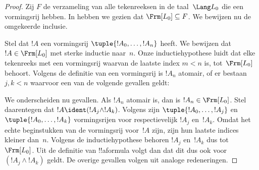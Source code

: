 \documentclass[../../../include/open-logic-section]{subfiles}
\begin{document}
\begin{proof}
Zij $F$ de verzameling van alle tekenreeksen in de taal~$\Lang L_0$
die een vormingsrij hebben. In 
hebben we gezien dat $\Frm[L_0] \subseteq F$. We bewijzen nu de
omgekeerde inclusie.

Stel dat $!A$ een vormingsrij $\tuple{!A_0,\dotsc,!A_n}$ heeft. We
bewijzen dat $!A \in \Frm[L_0]$ met sterke inductie naar~$n$. Onze
inductiehypothese luidt dat elke tekenreeks met een vormingsrij waarvan
de laatste index $m < n$ is, tot~$\Frm[L_0]$ behoort. Volgens de
definitie van een vormingsrij is $!A_n$ atomair, of er bestaan
$j,k < n$ waarvoor een van de volgende gevallen geldt:
\begin{enumerate}
\end{enumerate}
We onderscheiden nu gevallen. Als $!A_n$ atomair is, dan is
$!A_n \in \Frm[L_0]$. Stel daarentegen dat $!A \ident
(!A_j \land !A_k)$. Volgens  zijn
$\tuple{!A_0,\dotsc,!A_j}$ en $\tuple{!A_0,\dotsc,!A_k}$ vormingsrijen
voor respectievelijk $!A_j$ en~$!A_k$. Omdat het echte beginstukken
van de vormingsrij voor~$!A$ zijn, zijn hun laatste indices kleiner
dan~$n$. Volgens de inductiehypothese behoren $!A_j$ en~$!A_k$ dus
  tot~$\Frm[L_0]$. Uit de definitie van !!a{formula} volgt dan dat dit
  dus ook voor $(!A_j \land !A_k)$ geldt. De overige gevallen
volgen uit analoge redeneringen.
\end{proof}
\end{document}
